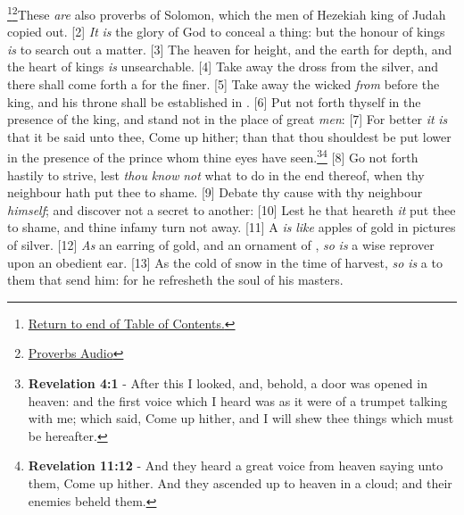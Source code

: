 \footnote{\textcolor[cmyk]{0.99998,1,0,0}{\hyperlink{TOC}{Return to end of Table of Contents.}}}\footnote{\href{https://audiobible.com/bible/proverbs_25.htm}{\textcolor[cmyk]{0.99998,1,0,0}{Proverbs Audio}}}\textcolor[cmyk]{0.99998,1,0,0}{These \emph{are} also proverbs of Solomon, which the men of Hezekiah king of Judah copied out.}
[2] \textcolor[cmyk]{0.99998,1,0,0}{\emph{It} \emph{is} the glory of God to conceal a thing: but the honour of kings \emph{is} to search out a matter.}
[3] \textcolor[cmyk]{0.99998,1,0,0}{The heaven for height, and the earth for depth, and the heart of kings \emph{is} unsearchable.}
[4] \textcolor[cmyk]{0.99998,1,0,0}{Take away the dross from the silver, and there shall come forth a  for the finer.}
[5] \textcolor[cmyk]{0.99998,1,0,0}{Take away the wicked \emph{from} before the king, and his throne shall be established in .}
[6] \textcolor[cmyk]{0.99998,1,0,0}{Put not forth thyself in the presence of the king, and stand not in the place of great \emph{men}:}
[7] \textcolor[cmyk]{0.99998,1,0,0}{For better \emph{it} \emph{is} that it be said unto thee, Come up hither; than that thou shouldest be put lower in the presence of the prince whom thine eyes have seen.}\footnote{\textbf{Revelation 4:1} - After this I looked, and, behold, a door was opened in heaven: and the first voice which I heard was as it were of a trumpet talking with me; which said, Come up hither, and I will shew thee things which must be hereafter.}\footnote{\textbf{Revelation 11:12} - And they heard a great voice from heaven saying unto them, Come up hither. And they ascended up to heaven in a cloud; and their enemies beheld them.}
[8] \textcolor[cmyk]{0.99998,1,0,0}{Go not forth hastily to strive, lest \emph{thou} \emph{know} \emph{not} what to do in the end thereof, when thy neighbour hath put thee to shame.}
[9] \textcolor[cmyk]{0.99998,1,0,0}{Debate thy cause with thy neighbour \emph{himself}; and discover not a secret to another:}
[10] \textcolor[cmyk]{0.99998,1,0,0}{Lest he that heareth \emph{it} put thee to shame, and thine infamy turn not away.}
[11] \textcolor[cmyk]{0.99998,1,0,0}{A  \emph{is} \emph{like} apples of gold in pictures of silver.}
[12] \textcolor[cmyk]{0.99998,1,0,0}{\emph{As} an earring of gold, and an ornament of , \emph{so} \emph{is} a wise reprover upon an obedient ear.}
[13] \textcolor[cmyk]{0.99998,1,0,0}{As the cold of snow in the time of harvest, \emph{so} \emph{is} a  to them that send him: for he refresheth the soul of his masters.}
